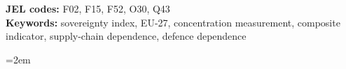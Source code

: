 \documentclass[12pt,a4paper]{article}
\begin{document}
\vfill
\noindent\textbf{JEL codes:} F02, F15, F52, O30, Q43\\[0.3cm]
\noindent\textbf{Keywords:} sovereignty index, EU-27, concentration measurement,
composite indicator, supply-chain dependence, defence dependence
\isiendtitlepage
\hypersetup{pageanchor=true}


\newpage


\newpage

\newpage

\newpage

\newpage

\newpage

\newpage

\newpage

\newpage

\newpage


\newpage


\newpage
\begingroup\emergencystretch=2em

\endgroup

\newpage
\appendix

\newpage

\newpage

\newpage

\end{document}
